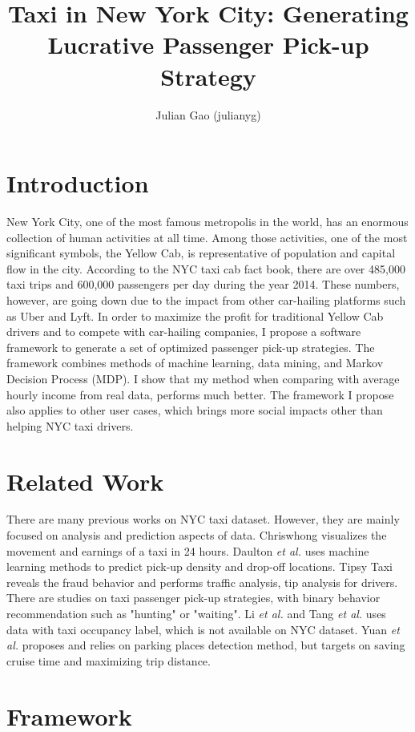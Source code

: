 \documentclass[letterpaper, 10 pt, conference]{ieeeconf}
\title{\LARGE \bf Taxi in New York City: Generating Lucrative Passenger Pick-up Strategy}
\author{Julian Gao (julianyg)}
\affil{Stanford University \authorcr
  julianyg@stanford.edu}
\begin{document}
\maketitle
\section{Introduction}
New York City, one of the most famous metropolis in the world, has an enormous collection of human activities at all time. Among those activities, one of the most significant symbols, the Yellow Cab, is representative of population and capital flow in the city. According to the NYC taxi cab fact book\cite{factbook}, there are over 485,000 taxi trips and 600,000 passengers per day during the year 2014. These numbers, however, are going down due to the impact from other car-hailing platforms such as Uber and Lyft. In order to maximize the profit for traditional Yellow Cab drivers and to compete with car-hailing companies, I propose a software framework to generate a set of optimized passenger pick-up strategies. The framework combines methods of machine learning, data mining, and Markov Decision Process (MDP). I show that my method when comparing with average hourly income from real data, performs much better. The framework I propose also applies to other user cases, which brings more social impacts other than helping NYC taxi drivers.
\section{Related Work}
There are many previous works on NYC taxi dataset. However, they are mainly focused on analysis and prediction aspects of data. Chriswhong visualizes the movement and earnings of a taxi in 24 hours\cite{cw}. Daulton \textit{et al.} uses machine learning methods to predict pick-up density and drop-off locations\cite{harvard}. Tipsy Taxi reveals the fraud behavior and performs traffic analysis, tip analysis for drivers\cite{tipsy}. There are studies on taxi passenger pick-up strategies, with binary behavior recommendation such as "hunting" or "waiting". Li \textit{et al.}\cite{li} and Tang \textit{et al.} uses data with taxi occupancy label\cite{tang}, which is not available on NYC dataset. Yuan \textit{et al.} proposes and relies on parking places detection method, but targets on saving cruise time and maximizing trip distance\cite{yuan}. 
\section{Framework}
\end{document}
